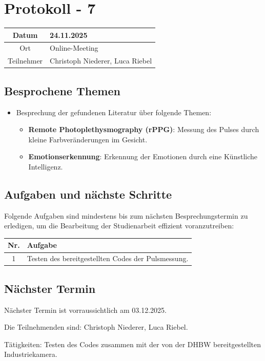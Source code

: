 \chapter{Protokoll - 7}

\begin{table}[H]
    \centering
    \begin{tabular}{|c|l|}
        \hline
        Datum& 24.11.2025 \\
        \hline
        Ort& Online-Meeting\\
        \hline
        Teilnehmer& Christoph Niederer, Luca Riebel\\
        \hline
    \end{tabular}
\end{table}

\section{Besprochene Themen}
\begin{itemize}
    \item Besprechung der gefundenen Literatur über folgende Themen:
    \begin{itemize}
        \item \textbf{Remote Photoplethysmography (rPPG)}: Messung des Pulses durch kleine Farbveränderungen im Gesicht.
        \item \textbf{Emotionserkennung}: Erkennung der Emotionen durch eine Künstliche Intelligenz.
    \end{itemize}
\end{itemize}

\section{Aufgaben und nächste Schritte}
Folgende Aufgaben sind mindestens bis zum nächsten Besprechungstermin zu erledigen, um die Bearbeitung der Studienarbeit effizient voranzutreiben:

\begin{table}[H]
    \centering
    \begin{tabular}{|c|p{12cm}|}
        \hline
        \textbf{Nr.} & \textbf{Aufgabe}\\
        \hline
        1 & Testen des bereitgestellten Codes der Pulsmessung.\\
        \hline
    \end{tabular}
\end{table}

\section{Nächster Termin}
Nächster Termin ist vorraussichtlich am 03.12.2025.

Die Teilnehmenden sind: Christoph Niederer, Luca Riebel. 

Tätigkeiten: Testen des Codes zusammen mit der von der DHBW bereitgestellten Industriekamera.
